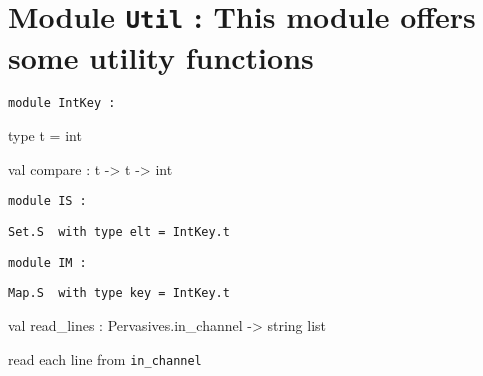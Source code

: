 \documentclass[11pt]{article}
\begin{document}
\tableofcontents
\section{Module {\tt{Util}} : This module offers some utility functions}
\label{module:Util}




\ocamldocvspace{0.5cm}



\begin{ocamldoccode}
{\tt{module }}{\tt{IntKey}}{\tt{ : }}\end{ocamldoccode}
\label{module:Util.IntKey}

\begin{ocamldocsigend}


\label{type:Util.IntKey.t}\begin{ocamldoccode}
type t = int 
\end{ocamldoccode}


\label{val:Util.IntKey.compare}\begin{ocamldoccode}
val compare : t -> t -> int
\end{ocamldoccode}
\end{ocamldocsigend}






\begin{ocamldoccode}
{\tt{module }}{\tt{IS}}{\tt{ : }}\end{ocamldoccode}
\label{module:Util.IS}

{\tt{Set.S}}{\tt{ }}{\tt{ with type elt = IntKey.t}}





\begin{ocamldoccode}
{\tt{module }}{\tt{IM}}{\tt{ : }}\end{ocamldoccode}
\label{module:Util.IM}

{\tt{Map.S}}{\tt{ }}{\tt{ with type key = IntKey.t}}





\label{val:Util.read-underscorelines}\begin{ocamldoccode}
val read_lines : Pervasives.in_channel -> string list
\end{ocamldoccode}
\begin{ocamldocdescription}
read each line from {\tt{in\_channel}}


\end{ocamldocdescription}
\end{document}
